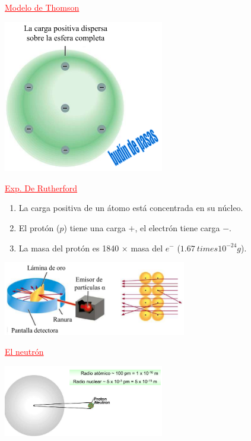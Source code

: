         \begin{center} \textcolor{red}{\underline{Modelo de Thomson}} \end{center}
        \begin{center} \includegraphics[width=7cm]{./imagenes/modeloDeThomson.png} \\[2cm] \end{center}
        
            \begin{center} \textcolor{red}{\underline{Exp. De Rutherford}} \end{center}
            \begin{enumerate} 
                \item La carga positiva de un átomo está concentrada en su núcleo.
                \item El protón ($p$) tiene una carga $+$, el electrón tiene carga $-$.
                \item La masa del protón es 1840 $\times$ masa del $e^-$ ($1.67 \ times 10^{-24}g$).
            \end{enumerate}

            \begin{center} \includegraphics[width=8cm]{./imagenes/experimentoRutherford.png} \end{center}

        \begin{center} \textcolor{red}{\underline{El neutrón}} \end{center}
            \begin{center} \includegraphics[width=7cm] {./imagenes/neutron.png} \end{center}

